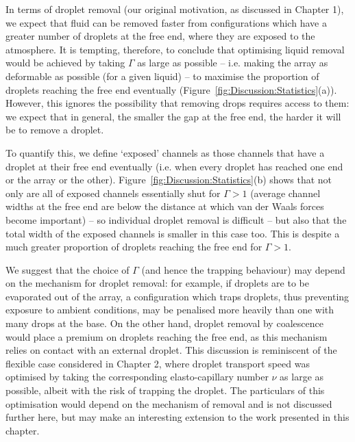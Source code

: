 In terms of droplet removal (our original motivation, as discussed in Chapter 1), we expect that fluid can be removed faster from configurations which have a greater number of droplets at the free end, where they are exposed to the atmosphere. It is tempting, therefore, to conclude that optimising liquid removal would be achieved by taking $\Gamma$ as large as possible -- i.e. making the array as deformable as possible (for a given liquid) -- to maximise the proportion of droplets reaching the free end eventually (Figure~\ref{fig:Discussion:Statistics}(a)). However, this ignores the possibility that removing drops requires access to them: we expect that in general, the smaller the gap at the free end, the harder it will be to remove a droplet.

To quantify this, we define `exposed' channels as those channels that have a droplet at their free end eventually (i.e. when every droplet has reached one end or the array or the other). Figure~\ref{fig:Discussion:Statistics}(b) shows that not only are all of
exposed channels essentially shut for $\Gamma > 1$ (average channel widths at the free end are below the distance at which van der Waals forces become important) -- so individual droplet removal is difficult -- but also that the total width of the exposed channels is smaller in this case too. This is despite a much greater proportion of droplets reaching the free end for $\Gamma > 1$.

We suggest that the choice of $\Gamma$ (and hence the trapping behaviour) may depend on the mechanism for droplet removal: for example, if droplets are to be evaporated out of the array, a configuration which traps droplets, thus preventing exposure to ambient conditions, may be penalised more heavily than one with many drops at the base. On the other hand, droplet removal by coalescence~\citep{Wisdom2013PNAS} would place a premium on droplets reaching the free end, as this mechanism relies on contact with an external droplet.
 This discussion is reminiscent of the flexible case considered in Chapter 2, where droplet transport speed was optimised by taking the corresponding elasto-capillary number $\nu$ as large as possible, albeit with the risk of trapping the droplet. The particulars of this optimisation would depend on the mechanism of removal and is not discussed further here, but may make an interesting extension to the work presented in this chapter.

